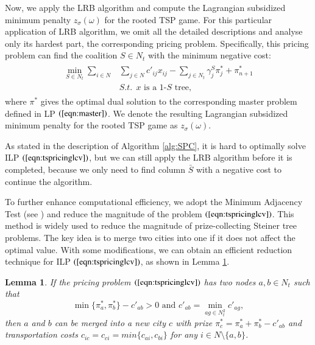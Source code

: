 \documentclass[authoryear,review,12pt]{elsarticle}
\newtheorem{lemma}{Lemma}
\begin{document}
Now, we apply the LRB algorithm and compute the Lagrangian subsidized minimum penalty $z_{\sigma}(\omega)$ for the rooted TSP game.
For this particular application of LRB algorithm, we omit all the detailed descriptions and analyse only its hardest part, the corresponding pricing problem.
Specifically, this pricing problem can find the coalition $S \in N_t$ with the minimum negative cost:
\begin{eqnarray}\label{eqn:tspricinglcv}
\begin{aligned}
\min_{S \in N_t} \sum_{i \in N} &\sum_{j \in N} c'_{ij}x_{ij} - \sum_{j \in N_t} \gamma_j^S \pi_j^* + \pi_{n+1}^*\\
&S.t.~~\text{$x$ is a 1-$S$ tree},
\end{aligned}
\end{eqnarray}
where $\pi^*$ gives the optimal dual solution to the corresponding master problem defined in LP $(\ref{eqn:master})$. We denote the resulting Lagrangian subsidized minimum penalty for the rooted TSP game as $z_{\sigma}(\omega)$.


As stated in the description of Algorithm \ref{alg:SPC}, it is hard to optimally solve ILP $(\ref{eqn:tspricinglcv})$, but we can still apply the LRB algorithm before it is completed, because we only need to find column $\bar{S}$ with a negative cost to continue the algorithm.


To further enhance computational efficiency, we adopt the Minimum Adjacency Test (see \citealt{duin1987some,ljubic2006algorithmic}) and reduce the magnitude of the problem $(\ref{eqn:tspricinglcv})$.
This method is widely used to reduce the magnitude of prize-collecting Steiner tree problems.
The key idea is to merge two cities into one if it does not affect the optimal value. With some modifications, we can obtain an efficient reduction technique for ILP $(\ref{eqn:tspricinglcv})$, as shown in Lemma \ref{lemma:reduction}.
\begin{lemma}\label{lemma:reduction}
If the pricing problem $(\ref{eqn:tspricinglcv})$ has two nodes $a,b \in N_t$ such that
\begin{equation*}
\min \big\{ \pi_a^*, \pi_b^* \big\} - c'_{ab} >0 \text{~and~} c'_{ab} = \min_{ag \in N_t^2}c'_{ag},
\end{equation*}
then $a$ and $b$ can be merged into a new city $c$ with prize $\pi_c^* = \pi_a^* + \pi_b^* - c'_{ab}$ and transportation costs $c_{ic} = c_{ci} = min \{c_{ai}, c_{bi}\}$ for any $i \in N \setminus \{a,b\}$.
\end{lemma}
\end{document}
